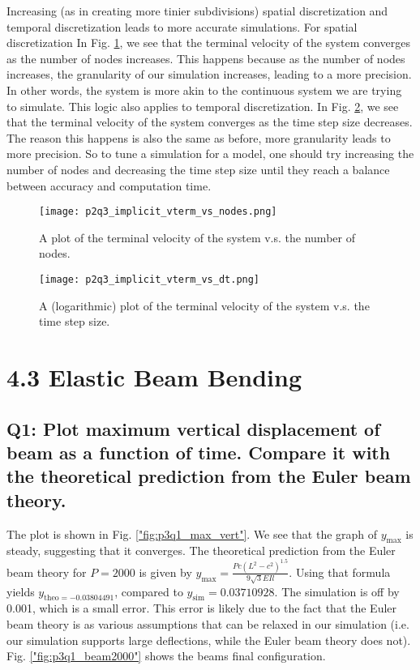\documentclass[letterpaper, 10 pt, conference]{ieeeconf}  %
\begin{document}
Increasing (as in creating more tinier subdivisions) spatial discretization and temporal discretization leads to more accurate simulations. For spatial discretization In Fig. \ref{"fig:p2q3_spatial"}, we see that the terminal velocity of the system converges as the number of nodes increases. This happens because as the number of nodes increases, the granularity of our simulation increases, leading to a more precision. In other words, the system is more akin to the continuous system we are trying to simulate. This logic also applies to temporal discretization. In Fig. \ref{"fig:p2q3_temporal"}, we see that the terminal velocity of the system converges as the time step size decreases. The reason this happens is also the same as before, more granularity leads to more precision. So to tune a simulation for a model, one should try increasing the number of nodes and decreasing the time step size until they reach a balance between accuracy and computation time.

\begin{figure}[!ht]
        \centering
        \texttt{[image: p2q3\_implicit\_vterm\_vs\_nodes.png]}
        \caption{A plot of the terminal velocity of the system v.s. the number of nodes.}
        \label{"fig:p2q3_spatial"}
\end{figure}

\begin{figure}[!ht]
        \centering
        \texttt{[image: p2q3\_implicit\_vterm\_vs\_dt.png]}
        \caption{A (logarithmic) plot of the terminal velocity of the system v.s. the time step size.}
        \label{"fig:p2q3_temporal"}
\end{figure}


\section{4.3 Elastic Beam Bending}

\subsection*{Q1: Plot maximum vertical displacement of beam as a function of time. Compare it with the theoretical prediction from the Euler beam theory.}

The plot is shown in Fig. \ref{"fig:p3q1_max_vert"}. We see that the graph of  $y_{\text{max}}$ is steady, suggesting that it converges. The theoretical prediction from the Euler beam theory for $P = 2000$ is given by $y_{\text{max}} = \frac{Pc(L^2-c^2)^1.5}{9\sqrt{3} E I l}$. Using that formula yields $y_{\text{theo} = -0.03804491}$, compared to $y_\text{sim}=0.03710928$. The simulation is off by 0.001, which is a small error. This error is likely due to the fact that the Euler beam theory is as various assumptions that can be relaxed in our simulation (i.e. our simulation supports large deflections, while the Euler beam theory does not). Fig. \ref{"fig:p3q1_beam2000"} shows the beams final configuration.
\end{document}
